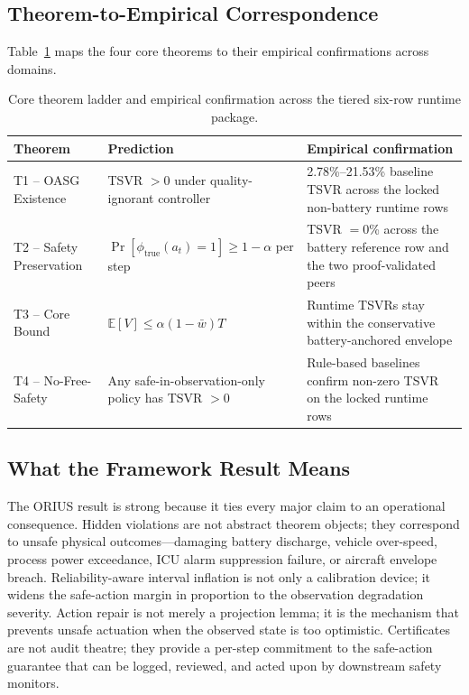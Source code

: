 \subsection{Theorem-to-Empirical Correspondence}

Table~\ref{tab:theorem-empirical-correspondence} maps the four core theorems
to their empirical confirmations across domains.

\begin{table}[htbp]
\centering
\caption{Core theorem ladder and empirical confirmation across the tiered six-row runtime package.}
\label{tab:theorem-empirical-correspondence}
\begin{tabular}{p{3.8cm}p{5.5cm}p{4.5cm}}
\toprule
\textbf{Theorem} & \textbf{Prediction} & \textbf{Empirical confirmation} \\
\midrule
T1 -- OASG Existence
  & TSVR $> 0$ under quality-ignorant controller
  & 2.78\%--21.53\% baseline TSVR across the locked non-battery runtime rows \\
\addlinespace
T2 -- Safety Preservation
  & $\Pr[\phi_{\text{true}}(a_t) = 1] \ge 1-\alpha$ per step
  & TSVR $= 0$\% across the battery reference row and the two proof-validated peers \\
\addlinespace
T3 -- Core Bound
  & $\mathbb{E}[V] \le \alpha(1-\bar{w})T$
  & Runtime TSVRs stay within the conservative battery-anchored envelope \\
\addlinespace
T4 -- No-Free-Safety
  & Any safe-in-observation-only policy has TSVR $> 0$
  & Rule-based baselines confirm non-zero TSVR on the locked runtime rows \\
\bottomrule
\end{tabular}
\end{table}

\subsection{What the Framework Result Means}

The ORIUS result is strong because it ties every major claim to an operational
consequence.  Hidden violations are not abstract theorem objects; they
correspond to unsafe physical outcomes---damaging battery discharge, vehicle
over-speed, process power exceedance, ICU alarm suppression failure, or
aircraft envelope breach.  Reliability-aware interval inflation is not only a
calibration device; it widens the safe-action margin in proportion to the
observation degradation severity.  Action repair is not merely a projection
lemma; it is the mechanism that prevents unsafe actuation when the observed
state is too optimistic.  Certificates are not audit theatre; they provide
a per-step commitment to the safe-action guarantee that can be logged,
reviewed, and acted upon by downstream safety monitors.

